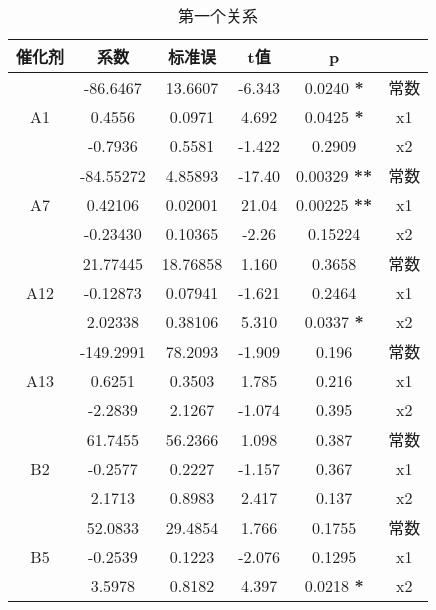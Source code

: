 \documentclass{article}
\begin{document}
\begin{table}
    \centering
    \caption{第一个关系}
    \begin{tabular}{c|c|c|c|c|c}
        \hline
        催化剂               & 系数      & 标准误   & t值    & p                   &      \\
        \hline
        \multirow{3}{*}{A1}  & -86.6467  & 13.6607  & -6.343 & 0.0240 \textbf{*}   & 常数 \\
                             & 0.4556    & 0.0971   & 4.692  & 0.0425 \textbf{*}   & x1   \\
                             & -0.7936   & 0.5581   & -1.422 & 0.2909              & x2   \\
        \hline
        \multirow{3}{*}{A7}  & -84.55272 & 4.85893  & -17.40 & 0.00329 \textbf{**} & 常数 \\
                             & 0.42106   & 0.02001  & 21.04  & 0.00225 \textbf{**} & x1   \\
                             & -0.23430  & 0.10365  & -2.26  & 0.15224             & x2   \\
        \hline
        \multirow{3}{*}{A12} & 21.77445  & 18.76858 & 1.160  & 0.3658              & 常数 \\
                             & -0.12873  & 0.07941  & -1.621 & 0.2464              & x1   \\
                             & 2.02338   & 0.38106  & 5.310  & 0.0337 \textbf{*}   & x2   \\
        \hline

        \multirow{3}{*}{A13} & -149.2991 & 78.2093  & -1.909 & 0.196               & 常数 \\
                             & 0.6251    & 0.3503   & 1.785  & 0.216               & x1   \\
                             & -2.2839   & 2.1267   & -1.074 & 0.395               & x2   \\
        \hline
        \multirow{3}{*}{B2} & 61.7455   & 56.2366  & 1.098  & 0.387               & 常数 \\
                             & -0.2577   & 0.2227   & -1.157 & 0.367               & x1   \\
                             & 2.1713    & 0.8983   & 2.417  & 0.137               & x2   \\
        \hline
        \multirow{3}{*}{B5} & 52.0833   & 29.4854  & 1.766  & 0.1755              & 常数 \\
                             & -0.2539   & 0.1223   & -2.076 & 0.1295              & x1   \\
                             & 3.5978    & 0.8182   & 4.397  & 0.0218 \textbf{*}   & x2   \\
        \hline
    \end{tabular}
\end{table}
\end{document}
